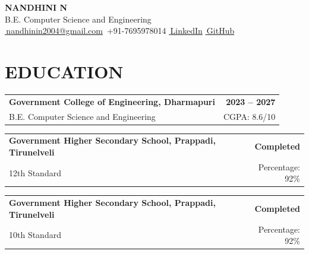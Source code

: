 \documentclass[10pt, a4paper]{article}
\newcommand{\iconlink}[3]{\href{#2}{\textcolor{iconcolor}{#1}\,{#3}}}
\newcommand{\icontext}[2]{\textcolor{iconcolor}{#1}\,{#2}}
\begin{document}
\pagestyle{empty}

\begin{center}
  {\LARGE \textbf{NANDHINI N}} \\[1pt]
  {\small B.E. Computer Science and Engineering} \\[3pt]
  \iconlink{\faEnvelope}{mailto:nandhinin2004@gmail.com}{nandhinin2004@gmail.com}
  \quad\textbar\quad
  \icontext{\faPhone}{+91-7695978014}
  \quad\textbar\quad
  \iconlink{\faLinkedin}{https://www.linkedin.com/in/nandhini-n-43532633b}{LinkedIn}
  \quad\textbar\quad
  \iconlink{\faGithub}{https://github.com/nandhu0424}{GitHub}
\end{center}

\section{EDUCATION}

\begin{tabularx}{\textwidth}{@{}X r@{}}
  \textbf{Government College of Engineering, Dharmapuri} & \textbf{2023 -- 2027} \\
  B.E. Computer Science and Engineering & CGPA: 8.6/10 \\
\end{tabularx}

\vspace{1pt}

\begin{tabularx}{\textwidth}{@{}X r@{}}
  \textbf{Government Higher Secondary School, Prappadi, Tirunelveli} & \textbf{Completed} \\
  12th Standard & Percentage: 92\% \\
\end{tabularx}

\vspace{1pt}

\begin{tabularx}{\textwidth}{@{}X r@{}}
  \textbf{Government Higher Secondary School, Prappadi, Tirunelveli} & \textbf{Completed} \\
  10th Standard & Percentage: 92\% \\
\end{tabularx}
\end{document}
